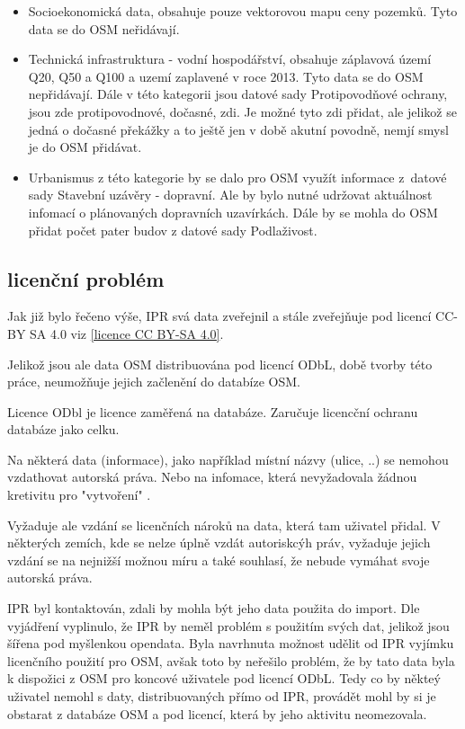 \begin{itemize}
    \item   Socioekonomická data, obsahuje pouze vektorovou mapu ceny pozemků.
            Tyto data se do OSM neřidávají.

    \item   Technická infrastruktura - vodní hospodářství, obsahuje záplavová území
            Q20, Q50 a Q100 a uzemí zaplavené v roce 2013. Tyto data se do OSM
            nepřidávají. Dále v této kategorii jsou datové sady Protipovodňové ochrany,
            jsou zde protipovodnové, dočasné, zdi. Je možné tyto zdi přidat,
            ale jelikož se jedná o dočasné překážky a to ještě jen v době akutní povodně,
            nemjí smysl je do OSM přidávat.

    \item   Urbanismus z této kategorie by se dalo pro OSM využít informace
            z~datové sady Stavební uzávěry - dopravní. Ale by bylo nutné udržovat
            aktuálnost infomací o plánovaných dopravních uzavírkách.
            Dále by se mohla do OSM přidat počet pater budov z datové sady
            Podlaživost.
\end{itemize}


\subsection{licenční problém}
\label{licenční problém}
Jak již bylo řečeno výše, IPR svá data zveřejnil a stále zveřejňuje pod licencí CC-BY SA 4.0 viz \ref{licence CC BY-SA 4.0}.

Jelikož jsou ale data OSM distribuována pod licencí ODbL,
době tvorby této práce, neumožňuje jejich začlenění do databíze OSM.

Licence ODbl je licence zaměřená na databáze. Zaručuje licencční 
ochranu databáze jako celku. 

Na některá data (informace), jako například místní názvy (ulice, ..)
se nemohou vzdathovat autorská práva. Nebo na infomace, která 
nevyžadovala žádnou kretivitu pro "vytvoření" . 

Vyžaduje ale vzdání se licenčních nároků 
na data, která tam uživatel přidal. V některých zemích, kde se nelze 
úplně vzdát autoriskcýh práv, vyžaduje jejich vzdání se na nejnižší 
možnou míru a také souhlasí, že nebude vymáhat svoje autorská práva.
\cite{ODbl}

IPR byl kontaktován, zdali by mohla být jeho data použita do import.
Dle vyjádření vyplinulo, že IPR by neměl problém s použitím svých dat, jelikož
jsou šířena pod myšlenkou opendata. Byla navrhnuta možnost udělit od IPR vyjímku
licenčního použití pro OSM, avšak toto by neřešilo problém, že by tato data byla
k dispožici z OSM pro koncové uživatele pod licencí ODbL. Tedy co by někteý
uživatel nemohl s daty, distribuovaných přímo od IPR, provádět mohl by si je
obstarat z databáze OSM a pod licencí, která by jeho aktivitu neomezovala.

